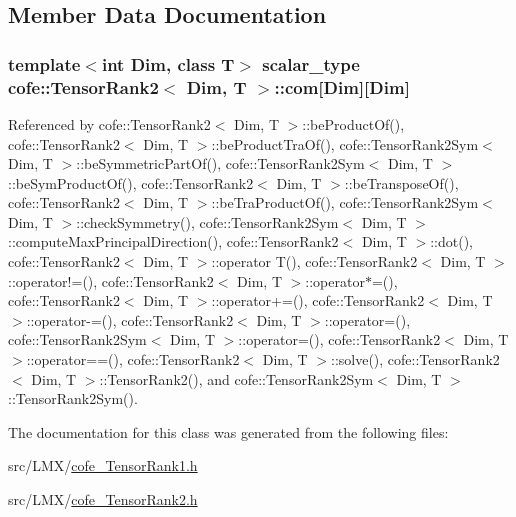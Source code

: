 \subsection{Member Data Documentation}
\hypertarget{classcofe_1_1TensorRank2_aa180922c86462cd1ecf2950f9c1ed80e}{
\subsubsection[{com}]{\setlength{\rightskip}{0pt plus 5cm}template$<$int Dim, class T$>$ {\bf scalar\-\_\-type} {\bf cofe\-::\-Tensor\-Rank2}$<$ Dim, T $>$\-::com\mbox{[}Dim\mbox{]}\mbox{[}Dim\mbox{]}\hspace{0.3cm}{\ttfamily [protected]}}}\label{classcofe_1_1TensorRank2_aa180922c86462cd1ecf2950f9c1ed80e}


Referenced by cofe\-::\-Tensor\-Rank2$<$ Dim, T $>$\-::be\-Product\-Of(), cofe\-::\-Tensor\-Rank2$<$ Dim, T $>$\-::be\-Product\-Tra\-Of(), cofe\-::\-Tensor\-Rank2\-Sym$<$ Dim, T $>$\-::be\-Symmetric\-Part\-Of(), cofe\-::\-Tensor\-Rank2\-Sym$<$ Dim, T $>$\-::be\-Sym\-Product\-Of(), cofe\-::\-Tensor\-Rank2$<$ Dim, T $>$\-::be\-Transpose\-Of(), cofe\-::\-Tensor\-Rank2$<$ Dim, T $>$\-::be\-Tra\-Product\-Of(), cofe\-::\-Tensor\-Rank2\-Sym$<$ Dim, T $>$\-::check\-Symmetry(), cofe\-::\-Tensor\-Rank2\-Sym$<$ Dim, T $>$\-::compute\-Max\-Principal\-Direction(), cofe\-::\-Tensor\-Rank2$<$ Dim, T $>$\-::dot(), cofe\-::\-Tensor\-Rank2$<$ Dim, T $>$\-::operator T(), cofe\-::\-Tensor\-Rank2$<$ Dim, T $>$\-::operator!=(), cofe\-::\-Tensor\-Rank2$<$ Dim, T $>$\-::operator$\ast$=(), cofe\-::\-Tensor\-Rank2$<$ Dim, T $>$\-::operator+=(), cofe\-::\-Tensor\-Rank2$<$ Dim, T $>$\-::operator-\/=(), cofe\-::\-Tensor\-Rank2$<$ Dim, T $>$\-::operator=(), cofe\-::\-Tensor\-Rank2\-Sym$<$ Dim, T $>$\-::operator=(), cofe\-::\-Tensor\-Rank2$<$ Dim, T $>$\-::operator==(), cofe\-::\-Tensor\-Rank2$<$ Dim, T $>$\-::solve(), cofe\-::\-Tensor\-Rank2$<$ Dim, T $>$\-::\-Tensor\-Rank2(), and cofe\-::\-Tensor\-Rank2\-Sym$<$ Dim, T $>$\-::\-Tensor\-Rank2\-Sym().



The documentation for this class was generated from the following files\-:\begin{DoxyCompactItemize}
\item 
src/\-L\-M\-X/\hyperlink{cofe__TensorRank1_8h}{cofe\-\_\-\-Tensor\-Rank1.\-h}\item 
src/\-L\-M\-X/\hyperlink{cofe__TensorRank2_8h}{cofe\-\_\-\-Tensor\-Rank2.\-h}\end{DoxyCompactItemize}
